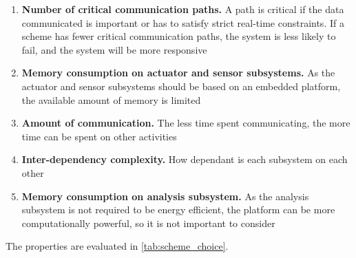 \begin{enumerate}
\item \textbf{Number of critical communication paths.} A path is critical if the data communicated is important or has to satisfy strict real-time constraints. If a scheme has fewer critical communication paths, the system is less likely to fail, and the system will be more responsive
\item \textbf{Memory consumption on actuator and sensor subsystems.} As the actuator and sensor subsystems should be based on an embedded platform, the available amount of memory is limited
\item \textbf{Amount of communication.} The less time spent communicating, the more time can be spent on other activities
\item \textbf{Inter-dependency complexity.} How dependant is each subsystem on each other
\item \textbf{Memory consumption on analysis subsystem.} As the analysis subsystem is not required to be energy efficient, the platform can be more computationally powerful, so it is not important to consider
\end{enumerate}

The properties are evaluated in \cref{tab:scheme_choice}.

